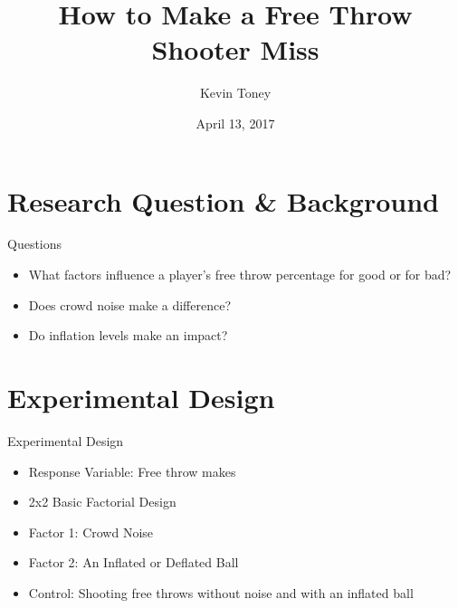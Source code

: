 \documentclass[ignorenonframetext,]{beamer}
\title{How to Make a Free Throw Shooter Miss}
\author{Kevin Toney}
\date{April 13, 2017}
\providecommand{\tightlist}{%
\setlength{\itemsep}{0pt}\setlength{\parskip}{0pt}}
\begin{document}
\frame{\titlepage}

\begin{frame}
\tableofcontents[hideallsubsections]
\end{frame}

\section{Research Question \&
Background}\label{research-question-background}

\begin{frame}{Questions}

\begin{itemize}
\tightlist
\item
  What factors influence a player's free throw percentage for good or
  for bad?
\item
  Does crowd noise make a difference?
\item
  Do inflation levels make an impact?
\end{itemize}

\end{frame}


\section{Experimental Design}\label{experimental-design}

\begin{frame}{Experimental Design}

\begin{itemize}
\tightlist
\item
  Response Variable: Free throw makes
  
\vspace{12pt}  

\item
  2x2 Basic Factorial Design
\item
  Factor 1: Crowd Noise
\item
  Factor 2: An Inflated or Deflated Ball
\item
  Control: Shooting free throws without noise and with an inflated ball
\end{itemize}

\end{frame}
\end{document}

